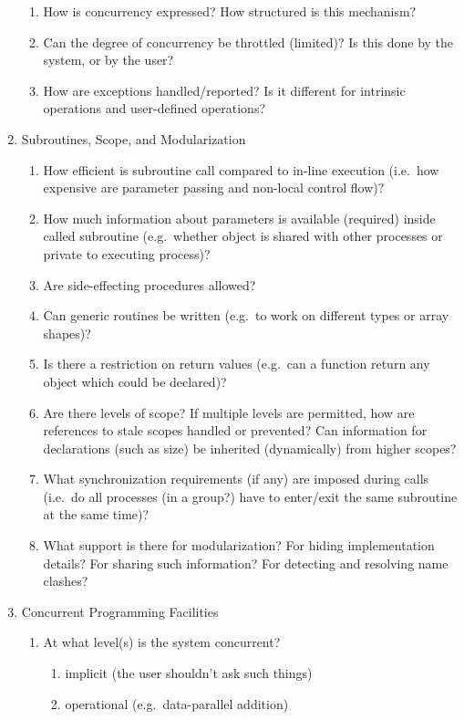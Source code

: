 \begin{enumerate}
\begin{enumerate}
  \item How is concurrency expressed?  How structured is this mechanism?
  \item Can the degree of concurrency be throttled (limited)?
	Is this done by the system, or by the user?
  \item How are exceptions handled/reported?
	Is it different for intrinsic operations and user-defined operations?
  \end{enumerate}
\item Subroutines, Scope, and Modularization
  \begin{enumerate}
  \item How efficient is subroutine call compared to in-line execution
	(i.e.\ how expensive are parameter passing and non-local control flow)?
  \item How much information about parameters is available (required)
	inside called subroutine
	(e.g.\ whether object is shared with other processes or private
	to executing process)?
  \item Are side-effecting procedures allowed?
  \item Can generic routines be written
	(e.g.\ to work on different types or array shapes)?
  \item Is there a restriction on return values (e.g.\ can a function return
	any object which could be declared)?
  \item Are there levels of scope?
	If multiple levels are permitted, how are references to stale scopes
	handled or prevented?
	Can information for declarations (such as size) be inherited (dynamically)
	from higher scopes?
  \item What synchronization requirements (if any) are imposed during calls
	(i.e.\ do all processes (in a group?) have to enter/exit the same subroutine
	at the same time)?
  \item What support is there for modularization?
	For hiding implementation details?
	For sharing such information?
	For detecting and resolving name clashes?
  \end{enumerate}
\item Concurrent Programming Facilities
  \begin{enumerate}
  \item At what level(s) is the system concurrent?
    \begin{enumerate}
    \item implicit (the user shouldn't ask such things)
    \item operational (e.g.\ data-parallel addition)

\end{enumerate}
\end{enumerate}
\end{enumerate}

